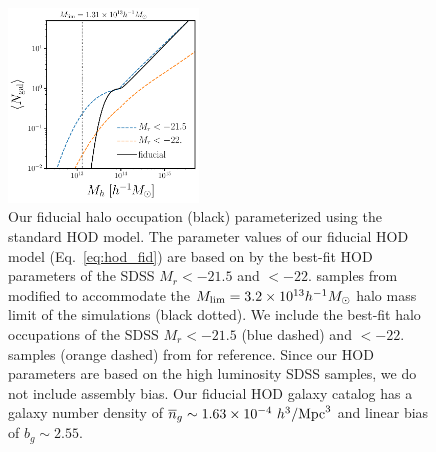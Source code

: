 \begin{figure}
\begin{center}
    \includegraphics[width=0.45\textwidth]{figs/hod_fid.pdf} 
    \caption{Our fiducial halo occupation (black) parameterized using the
    standard \cite{zheng2007} HOD model. The parameter values of our fiducial
    HOD model (Eq.~\ref{eq:hod_fid}) are based on by the best-fit HOD
    parameters of the SDSS $M_r < -21.5$ and $< -22.$ samples from
    \cite{zheng2007} modified to accommodate the $M_{\rm lim} = 3.2\times
    10^{13} h^{-1}M_\odot$ halo mass limit of the \quij simulations (black
    dotted). We include the best-fit halo occupations of the SDSS  $M_r <
    -21.5$ (blue dashed) and $< -22.$ samples (orange dashed) from
    \cite{zheng2007} for reference. Since our HOD parameters are based on the
    high luminosity SDSS samples, we do not include assembly bias.  Our
    fiducial HOD galaxy catalog has a galaxy number density of 
    $\overline{n}_g \sim 1.63\times10^{-4}~h^3/{\rm Mpc}^3$ and linear bias of
    $b_g \sim 2.55$.
    }\label{fig:hod}
\end{center}
\end{figure}

